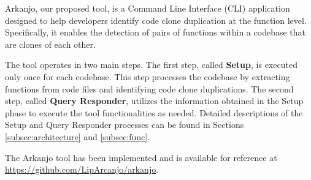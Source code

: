 \en

Arkanjo, our proposed tool, is a Command Line Interface (CLI) application designed to
help developers identify code clone duplication at the function level.
Specifically, it enables the detection of pairs of functions within a codebase
that are clones of each other.

The tool operates in two main steps. The first step, called \textbf{Setup}, is
executed only once for each codebase. This step processes the codebase by
extracting functions from code files and identifying code clone duplications.
The second step, called \textbf{Query Responder}, utilizes the information obtained in
the Setup phase to execute the tool functionalities as needed. Detailed
descriptions of the Setup and Query Responder processes can be found in
Sections \ref{subsec:architecture} and \ref{subsec:func}.

The Arkanjo tool has been implemented and is available for reference at
\url{https://github.com/LipArcanjo/arkanjo}.





